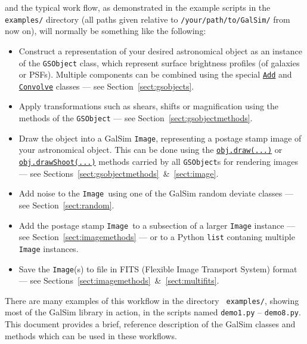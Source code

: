 \documentclass[preprint,11pt]{aastex}
\begin{document}
and the typical work flow, as demonstrated in the example scripts in the {\tt
examples/} directory (all paths given relative to
\texttt{/your/path/to/GalSim/} from now on), will normally
be something like the following:
\begin{itemize}

\item Construct a representation of your desired astronomical object
  as an instance of the {\tt GSObject} class, which represent surface brightness profiles (of galaxies or PSFs).  Multiple components can be
  combined using the special
  \href{http://galsim-developers.github.com/GalSim/classgalsim_1_1base_1_1_add.html}{\texttt{Add}}
  and 
  \href{http://galsim-developers.github.com/GalSim/classgalsim_1_1base_1_1_convolve.html}{\texttt{Convolve}}
  classes --- see Section~\ref{sect:gsobjects}.
\item Apply transformations such as shears, shifts or magnification
  using the methods of the \texttt{GSObject} --- see Section~\ref{sect:gsobjectmethods}.
\item Draw the object into a GalSim \texttt{Image}, representing a postage
  stamp image of your astronomical object.  This can be done using the
  \href{http://galsim-developers.github.com/GalSim/classgalsim_1_1base_1_1_g_s_object.html#ae0b346a8b438dedbc7f60a52220869d8}{\texttt{obj.draw(...)}}
  or
  \href{http://galsim-developers.github.com/GalSim/classgalsim_1_1base_1_1_g_s_object.html#a42ac334d2840ba3fa832988e998beca0}{\texttt{obj.drawShoot(...)}}
  methods carried by all \texttt{GSObject}s for rendering images --- see
  Sections~\ref{sect:gsobjectmethods}~\&~\ref{sect:image}.
\item Add noise to the \texttt{Image}~using one of the GalSim
  random deviate classes --- see Section~\ref{sect:random}.
\item Add the postage stamp \texttt{Image}~to a subsection of a larger
  \texttt{Image} 
  instance --- see
  Section~\ref{sect:imagemethods} --- or to a Python
  \texttt{list} contaning multiple \texttt{Image} instances.
\item Save the \texttt{Image}(s) to file in FITS (Flexible Image Transport
  System) format --- see Sections~\ref{sect:imagemethods}~\&~\ref{sect:multifits}.
\end{itemize}

There are many examples of this workflow in the directory {\tt
 examples/}, showing most of the GalSim library in action, in
the scripts named \texttt{demo1.py} -- \texttt{demo8.py}.  This
document provides a brief, reference description of the GalSim classes
and methods which can be used in these workflows.
\end{document}
